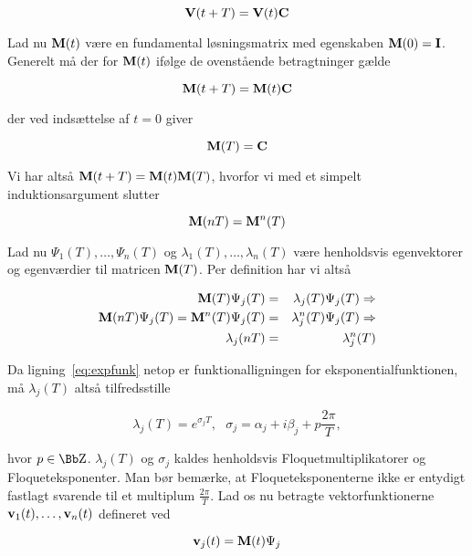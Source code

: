 \begin{equation}
{\bf V}(t+T) = {\bf V}(t){\bf C}
\end{equation}

Lad nu ${\bf M}(t)$ v{\ae}re en fundamental
l{\o}sningsmatrix med egenskaben ${\bf M}(0) = {\bf I}$.
Generelt m{\aa} der for ${\bf M}(t)$ if{\o}lge de
ovenst{\aa}ende betragtninger g{\ae}lde

$$
 {\bf M}(t+T) = {\bf M}(t) {\bf C} 
$$ 

der ved inds{\ae}ttelse af $t=0$ giver

\begin{equation}
 {\bf M}(T) = {\bf C} 
\end{equation}

Vi har alts{\aa} ${\bf M}(t+T)={\bf M}(t){\bf M}(T)$,
hvorfor vi med et simpelt induktionsargument slutter

\begin{equation}
 {\bf M}(nT) = {\bf M}^n(T)
\end{equation}

Lad nu $\Psi_1(T),\ldots,\Psi_n(T)$ og
$\lambda_1(T),\ldots,\lambda_n(T)$ v{\ae}re henholdsvis
egenvektorer og egenv{\ae}rdier til matricen ${\bf M}(T)$.
Per definition har vi alts{\aa}

\begin{eqnarray}
 {\bf M}(T) \Psi_j(T)  & = & \lambda_j(T) \Psi_j(T)   \Rightarrow \nonumber\\ 
{\bf M}(nT) \Psi_j(T) = 
{\bf M}^n(T)\Psi_j(T)  & = & \lambda^n_j(T) \Psi_j(T) \Rightarrow \nonumber\\ 
	 \lambda_j(nT) & = & \lambda^n_j(T)  
 \label{eq:expfunk}
\end{eqnarray}

Da lig\-ning~\ref{eq:expfunk} netop er
funktionallig\-ningen for eksponentialfunktionen, m{\aa}
$\lambda_j(T)$ alts{\aa} tilfredsstille

\begin{equation}
 \lambda_j(T) = e^{\sigma_j T},\mbox{\ \ }
 \sigma_j = \alpha_j + i\beta_j + p\frac{2\pi}{T},
 \label{eq:floq-mult-exp}
\end{equation}

hvor $p \in \Z$. $\lambda_j(T)$ og $\sigma_j$ kaldes
henholdsvis Floquetmultiplikatorer og Floqueteksponenter.
Man b{\o}r bem{\ae}rke, at Floqueteksponenterne ikke er
entydigt fastlagt svarende til et multiplum
$\frac{2\pi}{T}$. Lad os nu betragte vektorfunktionerne
${\bf v}_1(t),\ldots,{\bf v}_n(t)$ defineret ved

\begin{equation}
 {\bf v}_j(t) = {\bf M}(t) \Psi_j
\end{equation}

